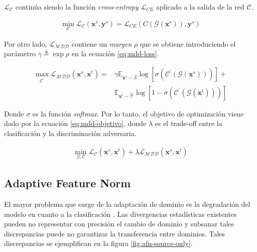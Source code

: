 $\mathcal{L}_{\mathcal{C}}$ continúa siendo la función {\it cross-entropy} $\mathcal{L}_{CE}$ aplicado a la salida de la red $\mathcal{C}$.

\begin{align}
    \min_{\mathcal{C}} \mathcal{L}_\mathcal{C}(\mathbf{x}^s, \mathbf{y}^s) = \mathcal{L}_{CE}(C(\mathcal{G}(\mathbf{x}^s)), \mathbf{y}^s)
    \label{eq:mdd-loss-clasificadora}
\end{align}

Por otro lado, $\mathcal{L}_{\mathcal{MDD}}$ contiene un {\it margen} $\rho$ que se obtiene introduciendo el parámetro
$\gamma \triangleq \exp \rho$ en la ecuación \ref{eq:mdd-loss}.

\begin{align}
    \max_{\mathcal{C}^{'}} \mathcal{L}_{\mathcal{MDD}}(\mathbf{x}^s, \mathbf{x}^t) = & \gamma \mathbb{E}_{\mathbf{x}^s \sim \mathcal{\hat{S}}} \log[\sigma(\mathcal{C}^{'}(\mathcal{G}(\mathbf{x}^s)))] + \nonumber \\
                                                                                     & \mathbb{E}_{\mathbf{x}^t \sim \mathcal{\hat{T}}} \log[1-\sigma(\mathcal{C}^{'}(\mathcal{G}(\mathbf{x}^t)))]
    \label{eq:mdd-loss}
\end{align}

Donde $\sigma$ es la función {\it softmax}. Por lo tanto, el objetivo de optimización viene dado por la ecuación
\ref{eq:mdd-objetivo}, donde $\lambda$ es el trade-off entre la clasificación y la discriminación adversaria.

\begin{align}
    \min_{\mathcal{G}, \mathcal{C}} \mathcal{L}_{\mathcal{C}}(\mathbf{x}^s, \mathbf{x}^t) + \lambda \mathcal{L}_{\mathcal{MDD}}(\mathbf{x}^s, \mathbf{x}^t)
    \label{eq:mdd-objetivo}
\end{align}

\subsection{Adaptive Feature Norm}

El mayor problema que surge de la adaptación de dominio es la degradación del modelo en cuanto a la clasificación \parencite{yosinski2014transferable}. Las divergencias estadísticas existentes pueden no representar con precisión el
cambio de dominio y subsanar tales discrepancias puede no garantizar la transferencia entre dominios. Tales
discrepancias se ejemplifican en la figura \ref{fig:afn-source-only}.


